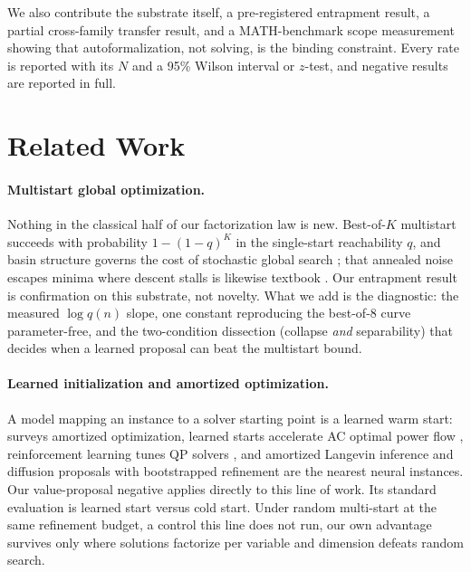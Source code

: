 \documentclass[letterpaper]{article} %
\begin{document}
We also contribute the substrate itself, a pre-registered entrapment result, a partial
cross-family transfer result, and a MATH-benchmark scope measurement showing that
autoformalization, not solving, is the binding constraint. Every rate is reported with its
$N$ and a 95\% Wilson interval or $z$-test, and negative results are reported in full.

\section{Related Work}
\label{sec:related}

\paragraph{Multistart global optimization.}
Nothing in the classical half of our factorization law is new. Best-of-$K$ multistart succeeds
with probability $1-(1-q)^K$ in the single-start reachability $q$, and basin structure governs
the cost of stochastic global search \citep{rinnooykan1987clustering,
rinnooykan1987multilevel}; that annealed noise escapes minima where descent stalls is likewise
textbook \citep{welling2011sgld, bras2021langevin, regularized2025langevin}. Our entrapment
result is confirmation on this substrate, not novelty. What we add is the diagnostic: the
measured $\log q(n)$ slope, one constant reproducing the best-of-8 curve parameter-free, and
the two-condition dissection (collapse \emph{and} separability) that decides when a learned
proposal can beat the multistart bound.

\paragraph{Learned initialization and amortized optimization.}
A model mapping an instance to a solver starting point is a learned warm start:
\citet{amos2023amortized} surveys amortized optimization, learned starts accelerate AC
optimal power flow \citep{baker2019warmstart}, reinforcement learning tunes QP solvers
\citep{ichnowski2021rlqp}, and amortized Langevin inference \citep{taniguchi2022langevin} and
diffusion proposals with bootstrapped refinement \citep{bootstrapped2025refinement} are the
nearest neural instances. Our value-proposal negative applies directly to this line of work. Its
standard evaluation is learned start versus cold start. Under random multi-start at the
same refinement budget, a control this line does not run, our own advantage survives
only where solutions factorize per variable and dimension defeats random search.
\end{document}
